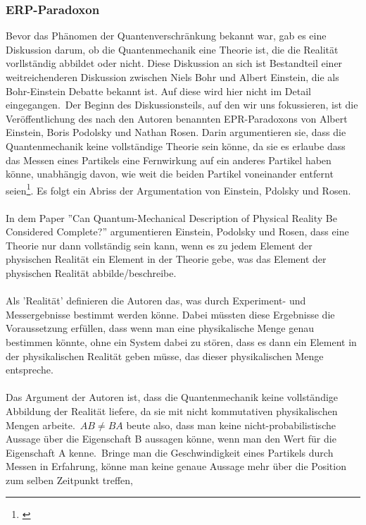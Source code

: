 \subsubsection{ERP-Paradoxon}
\label{subsubsec:erp_paradoxon}
Bevor das Phänomen der Quantenverschränkung bekannt war, gab es eine Diskussion darum, ob die Quantenmechanik eine Theorie ist, die die Realität vorllständig abbildet oder nicht.
Diese Diskussion an sich ist Bestandteil einer weitreichenderen Diskussion zwischen Niels Bohr und Albert Einstein,
die als Bohr-Einstein Debatte bekannt ist. Auf diese wird hier nicht im Detail eingegangen.\ Der Beginn des Diskussionsteils, auf den wir uns fokussieren,
ist die Veröffentlichung des nach den Autoren benannten EPR-Paradoxons von Albert Einstein, Boris Podolsky und Nathan Rosen. Darin argumentieren sie, dass die Quantenmechanik keine vollständige Theorie sein könne, da sie es erlaube
dass das Messen eines Partikels eine Fernwirkung auf ein anderes Partikel haben könne, unabhängig davon, wie weit die beiden Partikel voneinander entfernt seien\footnote{\cite{erp_1935}}. Es folgt ein Abriss der Argumentation von Einstein, Pdolsky und Rosen. \\\\
In dem Paper ''Can Quantum-Mechanical Description of Physical Reality Be Considered Complete?'' argumentieren Einstein, Podolsky und Rosen, dass
eine Theorie nur dann vollständig sein kann, wenn es zu jedem Element der physischen Realität ein Element in der Theorie gebe, was das Element
der physischen Realität abbilde/beschreibe.\\\\ Als 'Realität' definieren die Autoren das, was durch Experiment- und Messergebnisse bestimmt werden könne.
Dabei müssten diese Ergebnisse die Voraussetzung erfüllen, dass wenn man eine physikalische Menge genau bestimmen könnte, ohne ein System dabei zu stören,
dass es dann ein Element in der physikalischen Realität geben müsse, das dieser physikalischen Menge entspreche.\\\\
Das Argument der Autoren ist, dass die Quantenmechanik keine vollständige Abbildung der Realität liefere, da sie mit nicht kommutativen physikalischen Mengen arbeite.\
$AB \neq BA$ beute also, dass man keine nicht-probabilistische Aussage über die Eigenschaft B aussagen könne, wenn man den Wert für die Eigenschaft A kenne.\ Bringe man die Geschwindigkeit eines Partikels durch Messen in Erfahrung, könne man keine genaue Aussage mehr über die Position zum selben Zeitpunkt treffen,
